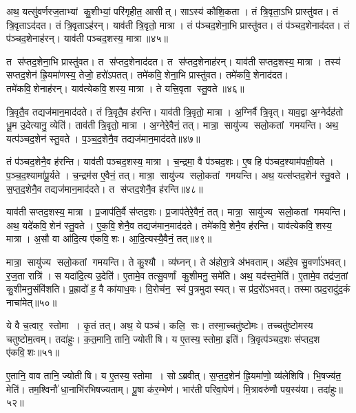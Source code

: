अथ॒ यत्सु॑वर्णरज॒ताभ्यां कु॒शीभ्यां॒ परि॑गृहीत॒ आसीत्।
साऽस्य॑ कौशि॒कता।
तं त्रि॒वृता॒ऽभि प्रास्तु॑वत।
तं त्रि॒वृताऽद॑दत।
तं त्रि॒वृताऽह॑रन्।
याव॑ती त्रि॒वृतो॒ मात्रा।
तं प॑ञ्चद॒शेना॒भि प्रास्तु॑वत।
तं प॑ञ्चद॒शेनाद॑दत।
तं प॑ञ्चद॒शेनाह॑रन्।
याव॑ती पञ्चद॒शस्य॒ मात्रा॥४५॥

त स॑प्तद॒शेना॒भि प्रास्तु॑वत।
त स॑प्तद॒शेनाद॑दत।
त स॑प्तद॒शेनाह॑रन्।
याव॑ती सप्तद॒शस्य॒ मात्रा।
तस्य॑ सप्तद॒शेन॑ ह्रि॒यमा॑णस्य॒ तेजो॒ हरो॑ऽपतत्।
तमे॑कवि॒शेना॒भि प्रास्तु॑वत।
तमे॑कवि॒शेनाद॑दत।
तमे॑कवि॒शेनाह॑रन्।
याव॑त्येकवि॒शस्य॒ मात्रा।
ते यत्त्रि॒वृता स्तु॒वते॥४६॥

त्रि॒वृतै॒व तद्यज॑मान॒माद॑दते।
तं त्रि॒वृतै॒व ह॑रन्ति।
याव॑ती त्रि॒वृतो॒ मात्रा।
अ॒ग्निर्वै त्रि॒वृत्।
याव॒द्वा अ॒ग्नेर्दह॑तो धू॒म उ॒देत्यानु॒ व्येति॑।
ताव॑ती त्रि॒वृतो॒ मात्रा।
अ॒ग्नेरे॒वैनं॒ तत्।
मात्रा॒ सायु॑ज्य सलो॒कतां गमयन्ति।
अथ॒ यत्प॑ञ्चद॒शेन॑ स्तु॒वते।
प॒ञ्च॒द॒शेनै॒व तद्यज॑मान॒माद॑दते॥४७॥

तं प॑ञ्चद॒शेनै॒व ह॑रन्ति।
याव॑ती पञ्चद॒शस्य॒ मात्रा।
च॒न्द्रमा॒ वै प॑ञ्चद॒शः।
ए॒ष हि प॑ञ्चद॒श्याम॑पक्षी॒यते।
प॒ञ्च॒द॒श्यामा॑पू॒र्यते।
च॒न्द्रम॑स ए॒वैनं॒ तत्।
मात्रा॒ सायु॑ज्य सलो॒कतां गमयन्ति।
अथ॒ यत्स॑प्तद॒शेन॑ स्तु॒वते।
स॒प्त॒द॒शेनै॒व तद्यज॑मान॒माद॑दते।
त स॑प्तद॒शेनै॒व ह॑रन्ति॥४८॥

याव॑ती सप्तद॒शस्य॒ मात्रा।
प्र॒जाप॑ति॒र्वै स॑प्तद॒शः।
प्र॒जाप॑तेरे॒वैनं॒ तत्।
मात्रा॒ सायु॑ज्य सलो॒कतां गमयन्ति।
अथ॒ यदे॑कवि॒शेन॑ स्तु॒वते।
ए॒क॒वि॒शेनै॒व तद्यज॑मान॒माद॑दते।
तमे॑कवि॒शेनै॒व ह॑रन्ति।
याव॑त्येक\-वि॒शस्य॒ मात्रा।
अ॒सौ वा आ॑दि॒त्य ए॑कवि॒शः।
आ॒दि॒त्यस्यै॒वैनं॒ तत्॥४९॥

मात्रा॒ सायु॑ज्य सलो॒कतां गमयन्ति।
ते कु॒श्यौ।
व्य॑घ्नन्।
ते अ॑होरा॒त्रे अ॑भवताम्।
अह॑रे॒व सु॒वर्णा॑ऽभवत्।
र॒ज॒ता रात्रि॑।
स यदा॑दि॒त्य उ॒देति॑।
ए॒तामे॒व तत्सु॒वर्णां कु॒शीमनु॒ समे॑ति।
अथ॒ यद॑स्त॒मेति॑।
ए॒तामे॒व तद्र॑ज॒तां कु॒शीमनु॒संवि॑शति।
प्र॒ह्रादो॑ ह॒ वै का॑याध॒वः।
वि॒रोच॑न॒ स्वं पु॒त्रमुदास्यत्।
स प्र॑द॒रो॑ऽभवत्।
तस्मात्प्रद॒रादु॑द॒कं नाचा॑मेत्॥५०॥\anuvakamend[आ॒दि॒त्यः प॑ञ्चद॒शस्य॒ मात्रा स्तु॒वते॑ पञ्चद॒शेनै॒व तद्यज॑मान॒माद॑दते सप्तद॒शेनै॒व ह॑रन्त्यादि॒त्यस्यै॒वैनं॒ तद्वि॑शति च॒त्वारि॑ च]

ये वै च॒त्वार॒ स्तोमा।
कृ॒तं तत्।
अथ॒ ये पञ्च॑।
कलि॒ सः।
तस्मा॒च्चतु॑ष्टोमः।
तच्चतु॑ष्टोमस्य चतुष्टोम॒त्वम्।
तदा॑हुः।
क॒त॒मानि॒ तानि॒ ज्योतीषि।
य ए॒तस्य॒ स्तोमा॒ इति॑।
त्रि॒वृत्प॑ञ्चद॒शः स॑प्तद॒श ए॑कवि॒शः॥५१॥

ए॒तानि॒ वाव तानि॒ ज्योतीषि।
य ए॒तस्य॒ स्तोमा।
सोऽब्रवीत्।
स॒प्त॒द॒शेन॑ ह्रि॒यमा॑णो॒ व्य॑लेशिषि।
भि॒षज्य॑त॒ मेति॑।
तम॒श्विनौ॑ धा॒नाभि॑रभिषज्यताम्।
पू॒षा क॑र॒म्भेण॑।
भार॑ती परिवा॒पेण॑।
मि॒त्रावरु॑णौ पय॒स्य॑या।
तदा॑हुः॥५२॥

